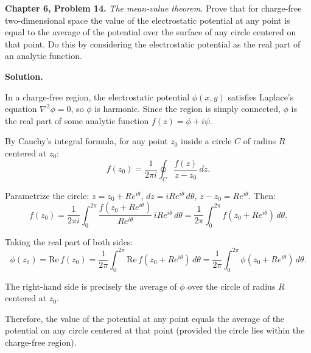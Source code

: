 \documentclass[12pt]{article}
\begin{document}
\textbf{Chapter 6, Problem 14.} \textit{The mean-value theorem.} Prove that for charge-free two-dimensional space the value of the electrostatic potential at any point is equal to the average of the potential over the surface of any circle centered on that point. Do this by considering the electrostatic potential as the real part of an analytic function.

\bigskip
\textbf{Solution.}

In a charge-free region, the electrostatic potential $\phi(x,y)$ satisfies Laplace's equation $\nabla^2\phi = 0$, so $\phi$ is harmonic. Since the region is simply connected, $\phi$ is the real part of some analytic function $f(z) = \phi + i\psi$.

By Cauchy's integral formula, for any point $z_0$ inside a circle $C$ of radius $R$ centered at $z_0$:
\[
f(z_0) = \frac{1}{2\pi i}\oint_C \frac{f(z)}{z-z_0}\,dz.
\]

Parametrize the circle: $z = z_0 + Re^{i\theta}$, $dz = iRe^{i\theta}\,d\theta$, $z - z_0 = Re^{i\theta}$. Then:
\[
f(z_0) = \frac{1}{2\pi i}\int_0^{2\pi}\frac{f(z_0+Re^{i\theta})}{Re^{i\theta}}\,iRe^{i\theta}\,d\theta = \frac{1}{2\pi}\int_0^{2\pi}f(z_0+Re^{i\theta})\,d\theta.
\]

Taking the real part of both sides:
\[
\phi(z_0) = \text{Re}\,f(z_0) = \frac{1}{2\pi}\int_0^{2\pi}\text{Re}\,f(z_0+Re^{i\theta})\,d\theta = \frac{1}{2\pi}\int_0^{2\pi}\phi(z_0+Re^{i\theta})\,d\theta.
\]

The right-hand side is precisely the average of $\phi$ over the circle of radius $R$ centered at $z_0$.

Therefore, the value of the potential at any point equals the average of the potential on any circle centered at that point (provided the circle lies within the charge-free region).
\end{document}

